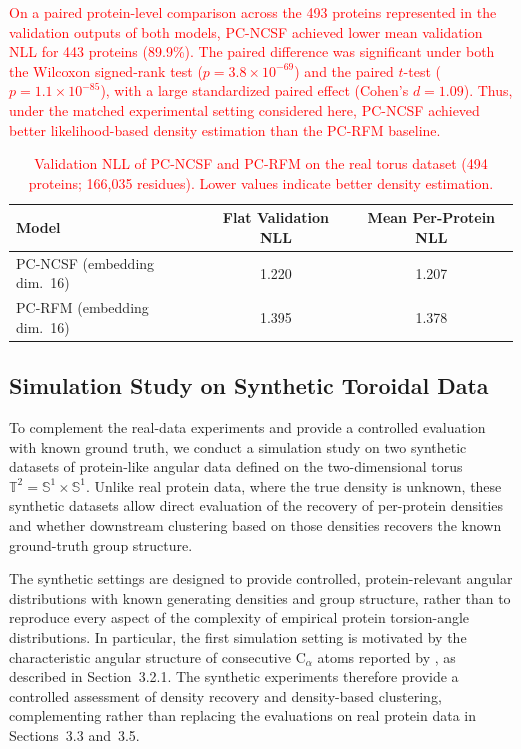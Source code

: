 \documentclass{article}
\begin{document}
\textcolor{red}{On a paired protein-level comparison across the 493 proteins
represented in the validation outputs of both models, PC-NCSF achieved lower
mean validation NLL for 443 proteins (89.9\%). The paired difference was
significant under both the Wilcoxon signed-rank test
($p = 3.8\times10^{-69}$) and the paired $t$-test
($p = 1.1\times10^{-85}$), with a large standardized paired effect
(Cohen's $d = 1.09$). Thus, under the matched experimental setting considered
here, PC-NCSF achieved better likelihood-based density estimation than the
PC-RFM baseline.}

\begin{table}[h]
\centering
\caption{\textcolor{red}{Validation NLL of PC-NCSF and PC-RFM on the real
torus dataset (494 proteins; 166{,}035 residues). Lower values indicate better
density estimation.}}
\label{tab:rfm_comparison}

\color{red}
\begin{tabular}{lcc}
\toprule
Model & Flat Validation NLL & Mean Per-Protein NLL \\
\midrule
PC-NCSF (embedding dim.\ 16) & 1.220 & 1.207 \\
PC-RFM (embedding dim.\ 16)  & 1.395 & 1.378 \\
\bottomrule
\end{tabular}
\color{black}

\end{table}

\subsection{Simulation Study on Synthetic Toroidal Data}
\label{sec:simulation}
To complement the real-data experiments and provide a controlled evaluation
with known ground truth, we conduct a simulation study on two synthetic datasets
of protein-like angular data defined on the two-dimensional torus
$\mathbb{T}^2 = \mathbb{S}^1 \times \mathbb{S}^1$.
Unlike real protein data, where the true density is unknown,
these synthetic datasets allow direct evaluation of the recovery of
per-protein densities and whether downstream clustering based on those
densities recovers the known ground-truth group structure.

{\color{red}
The synthetic settings are designed to provide controlled, protein-relevant
angular distributions with known generating densities and group structure,
rather than to reproduce every aspect of the complexity of empirical protein
torsion-angle distributions. In particular, the first simulation setting is
motivated by the characteristic angular structure of consecutive
$\mathrm{C}_\alpha$ atoms reported by \cite{Hamelryck2006}, as described in
Section~3.2.1. The synthetic experiments therefore provide a controlled
assessment of density recovery and density-based clustering, complementing
rather than replacing the evaluations on real protein data in
Sections~3.3 and~3.5.
}
\end{document}
